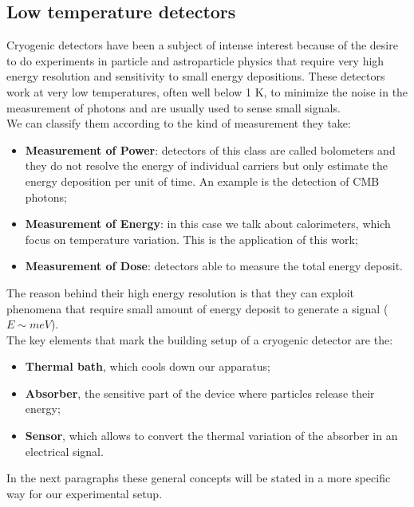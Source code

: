 \documentclass[12pt]{article}
\begin{document}
\subsection{Low temperature detectors}
Cryogenic detectors have been a subject of intense interest because of the desire to do experiments in particle and astroparticle physics that require very high energy resolution and sensitivity to small energy depositions. These detectors work at very low temperatures, often well below 1 K, to minimize the noise in the measurement of photons and are usually used to sense small signals.\\
We can classify them according to the kind of measurement they take:
\begin{itemize}
    \item \textbf{Measurement of Power}: detectors of this class are called bolometers and they do not resolve the energy of individual carriers but only estimate the energy deposition per unit of time. An example is the detection of CMB photons;
    \item \textbf{Measurement of Energy}: in this case we talk about calorimeters, which focus on temperature variation. This is the application of this work;
    \item \textbf{Measurement of Dose}: detectors able to measure the total energy deposit.
\end{itemize}
The reason behind their high energy resolution is that they can exploit phenomena that require small amount of energy deposit to generate a signal ($E\sim meV$).\\
The key elements that mark the building setup of a cryogenic detector are the:
\begin{itemize}
    \item \textbf{Thermal bath}, which cools down our apparatus;
    \item \textbf{Absorber}, the sensitive part of the device where particles release their energy;
    \item \textbf{Sensor}, which allows to convert the thermal variation of the absorber in an electrical signal.
\end{itemize}
In the next paragraphs these general concepts will be stated in a more specific way for our experimental setup.
\end{document}
